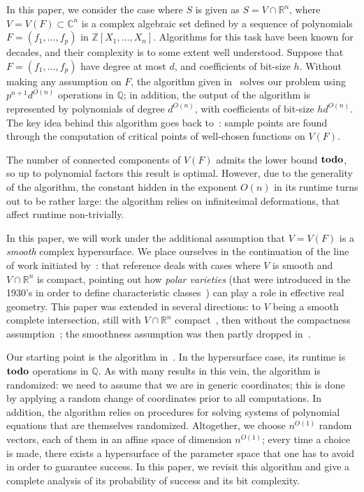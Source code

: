 \documentclass[a4paper]{article}
\newcommand{\ZZ}{{\mathbb{Z}}}
\def\C{\mathbb{C}}
\def\Q{\mathbb{Q}}
\def\R{\mathbb{R}}
\def\td{{\bf todo}}
\begin{document}
In this paper, we consider the case where $S$ is given as $S=V \cap
\R^n$, where $V=V(F) \subset \C^n$ is a complex algebraic set defined
by a sequence of polynomials $F = (f_1,\hdots,f_p)$ in $\ZZ[X_1,\dots,X_n]$. Algorithms for this task have been known for decades, and their
complexity is to some extent well understood. Suppose that $F = (f_1,\hdots,f_p)$ have degree at most $d$, and coefficients of bit-size $h$. Without making any assumption on $F$, the algorithm given
in~\cite[Section~13.1]{BaPoRo03} solves our problem using $p^{n+1}d^{O(n)}$
operations in $\Q$; in addition, the output of the algorithm is
represented by polynomials of degree $d^{O(n)}$, with coefficients of
bit-size $hd^{O(n)}$.  The key idea behind this algorithm goes back
to~\cite{GrVo88}: sample points are found through the computation of
critical points of well-chosen functions on $V(F)$.



The number of connected components of $V(F)$ admits the lower bound $\td$, so up to polynomial factors this result is
optimal. However, due to the generality of the algorithm, the constant
hidden in the exponent $O(n)$ in its runtime turns out to be rather
large: the algorithm relies on infinitesimal deformations, that affect
runtime non-trivially.



In this paper, we will work under the additional assumption that
$V=V(F)$ is a {\em smooth} complex hypersurface. We place ourselves in
the continuation of the line of work initiated by~\cite{BaGiHeMb97}:
that reference deals with cases where $V$ is smooth and $V \cap \R^n$
is compact, pointing out how {\em polar varieties} (that were
introduced in the 1930's in order to define characteristic
classes~\cite{Piene78,Teissier88}) can play a role in effective real
geometry. This paper was extended in several directions: to $V$ being
a smooth complete intersection, still with $V\cap \R^n$
compact~\cite{BaGiHeMb01}, then without the compactness
assumption~\cite{EMP,BaGiHePa05}; the smoothness assumption was then partly
dropped in~\cite{BaGiHe14,BaGiHeLePa12}.



Our starting point is the algorithm in~\cite{EMP}. In the hypersurface
case, its runtime is $\td$ operations in $\Q$.  As with many
results in this vein, the algorithm is randomized: we need to assume
that we are in generic coordinates; this is done by applying a random
change of coordinates prior to all computations. In addition, the
algorithm relies on procedures for solving systems of polynomial
equations that are themselves randomized.  Altogether, we choose
$n^{O(1)}$ random vectors, each of them in an affine space of
dimension $n^{O(1)}$; every time a choice is made, there exists a
hypersurface of the parameter space that one has to avoid in order to
guarantee success. In this paper, we revisit this algorithm and give a
complete analysis of its probability of success and its bit complexity.
\end{document}
